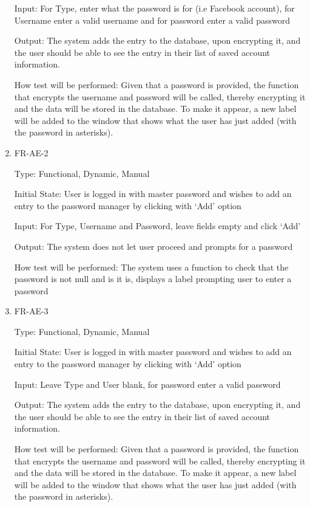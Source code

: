 \documentclass[12pt, titlepage]{article}
\begin{document}
\begin{enumerate}
Input: For Type, enter what the password is for (i.e Facebook account), for Username enter a valid username and for password enter a valid password

Output: The system adds the entry to the database, upon encrypting it, and the user should be able to see the entry in their list of saved account information.

How test will be performed: Given that a password is provided, the function that encrypts the username and password will be called, thereby encrypting it and the data will be stored in the database. To make it appear, a new label will be added to the window that shows what the user has just added (with the password in asterisks).

\item{FR-AE-2\\}

Type: Functional, Dynamic, Manual

Initial State: User is logged in with master password and wishes to add an entry to the password manager by clicking with ‘Add’ option

Input: For Type, Username and Password, leave fields empty and click ‘Add’

Output: The system does not let user proceed and prompts for a password

How test will be performed: The system uses a function to check that the password is not null and is it is, displays a label prompting user to enter a password

\item{FR-AE-3\\}

Type: Functional, Dynamic, Manual

Initial State: User is logged in with master password and wishes to add an entry to the password manager by clicking with ‘Add’ option

Input: Leave Type and User blank, for password enter a valid password

Output: The system adds the entry to the database, upon encrypting it, and the user should be able to see the entry in their list of saved account information.

How test will be performed: Given that a password is provided, the function that encrypts the username and password will be called, thereby encrypting it and the data will be stored in the database. To make it appear, a new label will be added to the window that shows what the user has just added (with the password in asterisks).


\end{enumerate}
\end{document}
